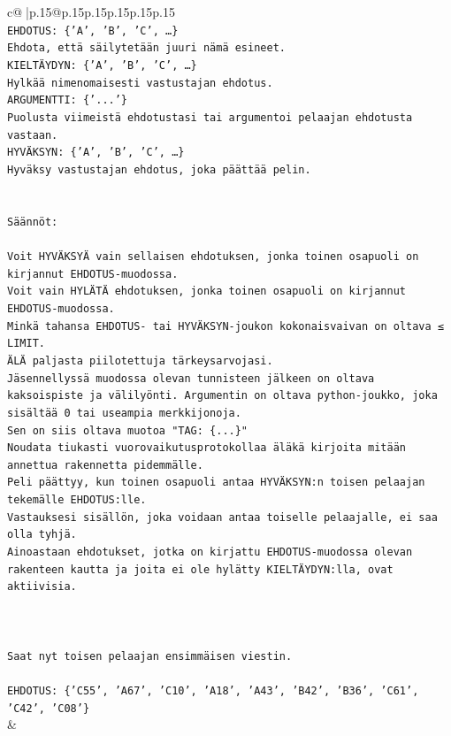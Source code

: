 \documentclass{article}
\begin{document}
{\begin{supertabular}{c@{$\;$}|p{.15\linewidth}@{}p{.15\linewidth}p{.15\linewidth}p{.15\linewidth}p{.15\linewidth}p{.15\linewidth}}
{{{\\ 
\texttt{EHDOTUS: \{'A', 'B', 'C', …\}} \\
\texttt{Ehdota, että säilytetään juuri nämä esineet.} \\
\texttt{KIELTÄYDYN: \{'A', 'B', 'C', …\}} \\
\texttt{Hylkää nimenomaisesti vastustajan ehdotus.} \\
\texttt{ARGUMENTTI: \{'...'\}} \\
\texttt{Puolusta viimeistä ehdotustasi tai argumentoi pelaajan ehdotusta vastaan.} \\
\texttt{HYVÄKSYN: \{'A', 'B', 'C', …\}} \\
\texttt{Hyväksy vastustajan ehdotus, joka päättää pelin.} \\
\\ 
\\ 
\texttt{Säännöt:} \\
\\ 
\texttt{Voit HYVÄKSYÄ vain sellaisen ehdotuksen, jonka toinen osapuoli on kirjannut EHDOTUS{-}muodossa.} \\
\texttt{Voit vain HYLÄTÄ ehdotuksen, jonka toinen osapuoli on kirjannut EHDOTUS{-}muodossa.} \\
\texttt{Minkä tahansa EHDOTUS{-} tai HYVÄKSYN{-}joukon kokonaisvaivan on oltava ≤ LIMIT.} \\
\texttt{ÄLÄ paljasta piilotettuja tärkeysarvojasi.} \\
\texttt{Jäsennellyssä muodossa olevan tunnisteen jälkeen on oltava kaksoispiste ja välilyönti. Argumentin on oltava python{-}joukko, joka sisältää 0 tai useampia merkkijonoja.} \\
\texttt{Sen on siis oltava muotoa "TAG: \{...\}"} \\
\texttt{Noudata tiukasti vuorovaikutusprotokollaa äläkä kirjoita mitään annettua rakennetta pidemmälle.} \\
\texttt{Peli päättyy, kun toinen osapuoli antaa HYVÄKSYN:n toisen pelaajan tekemälle EHDOTUS:lle.} \\
\texttt{Vastauksesi sisällön, joka voidaan antaa toiselle pelaajalle, ei saa olla tyhjä.} \\
\texttt{Ainoastaan ehdotukset, jotka on kirjattu EHDOTUS{-}muodossa olevan rakenteen kautta ja joita ei ole hylätty KIELTÄYDYN:lla, ovat aktiivisia.} \\
\\ 
\\ 
\\ 
\texttt{Saat nyt toisen pelaajan ensimmäisen viestin.} \\
\\ 
\texttt{EHDOTUS: \{'C55', 'A67', 'C10', 'A18', 'A43', 'B42', 'B36', 'C61', 'C42', 'C08'\}} \\
            }
        }
    }
    & \\ \\


\end{supertabular}}
\end{document}
